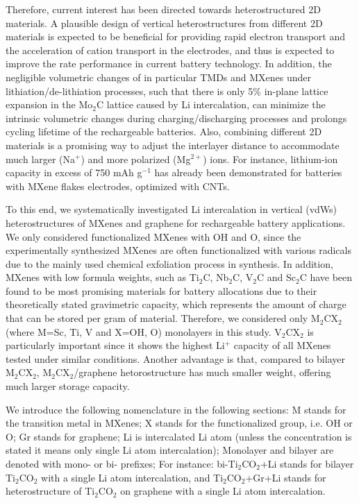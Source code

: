 Therefore, current interest has been directed towards heterostructured\cite{C5CS00937E,Pomerantseva_Gogotsi_2017} 2D materials. A plausible design of vertical heterostructures from different 2D materials is expected to be beneficial for providing rapid electron transport and the acceleration of cation transport in the electrodes, and thus is expected to improve the rate performance in current battery technology\cite{Pomerantseva_Gogotsi_2017}. In addition, the negligible volumetric changes of in particular TMDs and MXenes under lithiation/de-lithiation processes, such that there is only 5\% in-plane lattice expansion in the Mo$_2$C lattice caused by Li intercalation\cite{C6TA01918H}, can minimize the intrinsic volumetric changes during charging/discharging processes and prolongs cycling lifetime of the rechargeable batteries. Also, combining different 2D materials is a promising way to adjust the interlayer distance to accommodate much larger (Na$^{+}$) and more polarized (Mg$^{2+}$) ions. For instance, lithium-ion capacity in excess of 750 mAh g$^{-1}$\cite{CELC:CELC201600059} has already been demonstrated for batteries with MXene flakes electrodes, optimized with CNTs.

To this end, we systematically investigated Li intercalation in vertical (vdWs) heterostructures of MXenes and graphene for rechargeable battery applications. We only considered functionalized MXenes with  OH and O, since the experimentally synthesized MXenes are often functionalized with various radicals due to the mainly used chemical exfoliation process in synthesis. In addition, MXenes with low formula weights, such as Ti$_2$C, Nb$_2$C, V$_2$C and Sc$_2$C have been found to be most promising\cite{doi:10.1021/ja405735d} materials for battery allocations due to their theoretically stated gravimetric capacity, which represents the amount of charge that can be stored per gram of material. Therefore, we considered only M$_2$CX$_2$ (where M=Sc, Ti, V and X=OH, O) monolayers in this study. V$_2$CX$_2$ is particularly important since it shows the highest Li$^+$ capacity of all MXenes tested under similar conditions\cite{doi:10.1021/ja508154e}. Another advantage is that, compared to bilayer M$_2$CX$_2$, M$_2$CX$_2$/graphene hetorostructure has much smaller weight, offering much larger storage capacity. 

We introduce the following nomenclature in the following sections: M stands for the transition metal in MXenes; X stands for the functionalized group, i.e. OH or O; Gr stands for graphene; Li is intercalated Li atom (unless the concentration is stated it means only single Li atom intercalation); Monolayer and bilayer are denoted with mono- or bi- prefixes; For instance: bi-Ti$_2$CO$_2$+Li stands for bilayer Ti$_2$CO$_2$ with a single Li atom intercalation, and Ti$_2$CO$_2$+Gr+Li stands for heterostructure of Ti$_2$CO$_2$ on graphene with a single Li atom intercalation. 

